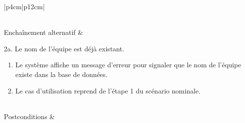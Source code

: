 \begin{longtable}{|p{4cm}|p{12cm}|}
\begin{minipage}[t]{\linewidth}
\begin{enumerate}[itemindent=0pt, leftmargin=*, nosep,after=\vspace{-\baselineskip},before=\vspace{-0.5\baselineskip}]
                \end{enumerate}
                \end{minipage}
                 \\
                \hline
                Enchaînement alternatif &  
                \begin{minipage}[t]{\linewidth}
                    2a. Le nom de l'équipe est déjà existant.
                    \begin{enumerate}[nosep,after=\strut]
                          \item Le système affiche un message d'erreur pour signaler que le nom de l'équipe existe dans la base de données.
                          \item Le cas d’utilisation reprend de l’étape 1 du scénario nominale.
                    \end{enumerate}
                \end{minipage}
                \\
                
                \hline
                Postconditions &   \\
                \hline
                \caption{Description du cas d'utilisation « Ajouter équipe »}\\
        \end{longtable}        
        
